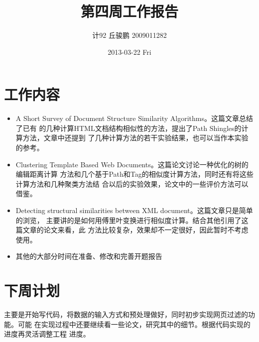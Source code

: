 \documentclass[a4paper]{article}
\title{第四周工作报告}
\author{计92 丘骏鹏 2009011282}
\date{2013-03-22 Fri}
\begin{document}
\maketitle



\section{工作内容}
\label{sec-1}

\begin{itemize}
\item A Short Survey of Document Structure Similarity Algorithms。这篇文章总结了已有
  的几种计算HTML文档结构相似性的方法，提出了Path Shingles的计算方法，文章中还提到
  了几种计算方法的若干实验结果，也可以当作本实验的参考。
\item Clustering Template Based Web Documents。这篇论文讨论一种优化的树的编辑距离计算
  方法和几个基于Path和Tag的相似度计算方法，同时还有将这些计算方法和几种聚类方法结
  合以后的实验效果，论文中的一些评价方法可以借鉴。
\item Detecting structural similarities between XML document。这篇文章只是简单的浏览，
  主要讲的是如何用傅里叶变换进行相似度计算。结合其他引用了这篇文章的论文来看，此
  方法比较复杂，效果却不一定很好，因此暂时不考虑使用。
\item 其他的大部分时间在准备、修改和完善开题报告
\end{itemize}
  
\section{下周计划}
\label{sec-2}

主要是开始写代码，将数据的输入方式和预处理做好，同时初步实现网页过滤的功能。可能
在实现过程中还要继续看一些论文，研究其中的细节。根据代码实现的进度再灵活调整工程
进度。
\end{document}
